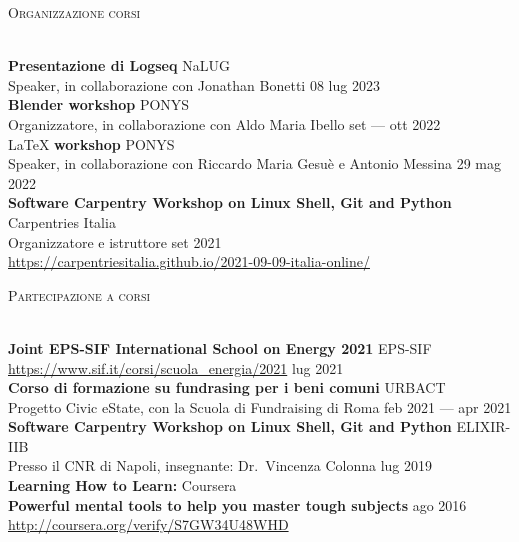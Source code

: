 \documentclass[a4paper]{article}
\newcommand{\lineunder} {
  \vspace*{-8pt} \\
  \hspace*{-18pt} \hrulefill \\
}
\newcommand{\header} [1] {
  {\hspace*{-18pt}\vspace*{6pt} \textsc{#1}}
  \vspace*{-6pt} \lineunder
}
\begin{document}
\header{Organizzazione corsi}
\vspace{1mm}

\textbf{Presentazione di Logseq} \hfill NaLUG \\
Speaker, in collaborazione con Jonathan Bonetti \hfill 08 lug 2023 \\
\vspace*{2mm}
\textbf{Blender workshop} \hfill PONYS \\
Organizzatore, in collaborazione con Aldo Maria Ibello \hfill set --- ott 2022 \\
\vspace*{2mm}
\LaTeX{} \textbf{workshop} \hfill PONYS \\
Speaker, in collaborazione con Riccardo Maria Gesuè e Antonio Messina \hfill 29 mag 2022 \\
\vspace*{2mm}
\textbf{Software Carpentry Workshop on Linux Shell, Git and Python} \hfill Carpentries Italia \\
Organizzatore e istruttore \hfill set 2021 \\
\url{https://carpentriesitalia.github.io/2021-09-09-italia-online/} \\
\vspace*{2mm}

\header{Partecipazione a corsi}
\vspace{1mm}

\textbf{Joint EPS-SIF International School on Energy 2021} \hfill EPS-SIF \\
\url{https://www.sif.it/corsi/scuola_energia/2021} \hfill lug 2021 \\
\vspace*{2mm}
\textbf{Corso di formazione su fundrasing per i beni comuni} \hfill URBACT \\
Progetto Civic eState, con la Scuola di Fundraising di Roma \hfill feb 2021 --- apr 2021\\
\vspace*{2mm}
\textbf{Software Carpentry Workshop on Linux Shell, Git and Python} \hfill ELIXIR-IIB\\
Presso il CNR di Napoli, insegnante: Dr.\ Vincenza Colonna \hfill lug 2019\\
\vspace*{2mm}
\textbf{Learning How to Learn:} \hfill Coursera\\
\textbf{Powerful mental tools to help you master tough subjects} \hfill ago 2016\\
\url{http://coursera.org/verify/S7GW34U48WHD}\\
\vspace*{2mm}
\end{document}
